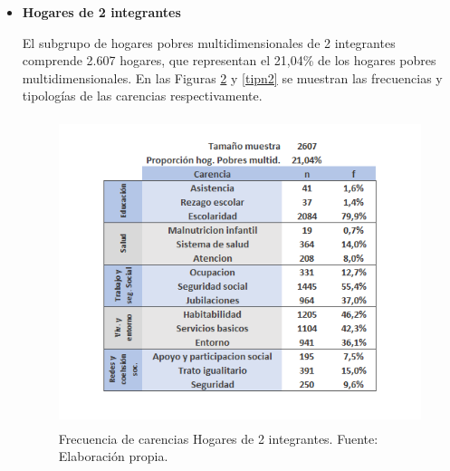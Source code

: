 \documentclass[12pt,letterpaper,spanish]{article}
\begin{document}
\begin{itemize}
\begin{figure}[H]
        \caption{Tipologías más frecuentes Hogares de 1 integrante. Fuente: Elaboración propia.}
        \label{tipn1}
    \end{figure}
    Escolaridad es la carencia más presente en los hogares unipersonales con una frecuencia de 74,2\%. Habitabilidad, Servicios básicos y Entorno, todas pertenecientes a la dimensión Vivienda y entorno, son las otras carencias más frecuentes. La carencia Malnutrición infantil no se encuentra presente en ningún hogar, y las carencias Asistencia Escolar y Rezago Escolar son las carencias menos presentes en los hogares, con frecuencias de 0,2\% y 0,1\% respectivamente. Esto resulta previsible debido a la definición de este tipo de hogar (hogares conformados por un solo integrante), ya que se espera que las personas que viven solas sean adultas.

    Los hogares de 1 integrante pobres multidimensionales presentan 259 tipologías de carencias. Dentro de las 10 tipologías más frecuentes, que representan el 47,51\% del subgrupo, se destaca la inexistencia de privaciones en las dimensiones de Salud y Redes y cohesión social, y la alta incidencia de Escolaridad y las carencias de la dimensión Vivienda y entorno.
    
    \item \textbf{Hogares de 2 integrantes}
    
    El subgrupo de hogares pobres multidimensionales de 2 integrantes comprende 2.607 hogares, que representan el 21,04\% de los hogares pobres multidimensionales. En las Figuras \ref{fren2} y \ref{tipn2} se muestran las frecuencias y tipologías de las carencias respectivamente. 
    \begin{figure}[H]
        \centering
        \includegraphics[height=9cm]{HOGARES/tabla_num2.png}
        \caption{Frecuencia de carencias Hogares de 2 integrantes. Fuente: Elaboración propia.}
        \label{fren2}
    \end{figure}


\end{itemize}
\end{document}

